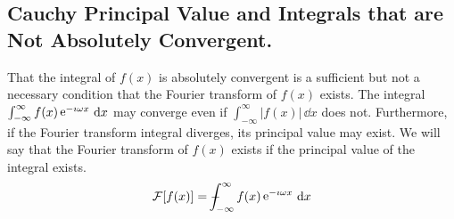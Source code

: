 \subsection{Cauchy Principal Value and Integrals that are Not Absolutely 
  Convergent.}


That the integral of $f(x)$ is absolutely convergent is a sufficient but
not a necessary
condition that the Fourier transform of $f(x)$ exists.  The integral
$\int_{-\infty}^\infty f(x) \mathop{\mathrm{e}}\nolimits^{-\imath \omega x}\,\mathrm{d} x$ may converge even if $\int_{-\infty}^\infty |f(x)|\,\dd x$
does not.  Furthermore, if the Fourier transform integral diverges, 
its principal value may exist.  We will say that the Fourier transform 
of $f(x)$ exists if the principal value of the integral exists.
\[ 
\mathcal{F}[f(x)] = - \negthickspace \negthickspace \negthickspace \negmedspace \int_{-\infty}^\infty f(x) \mathop{\mathrm{e}}\nolimits^{-\imath \omega x}\,\mathrm{d} x
\]







